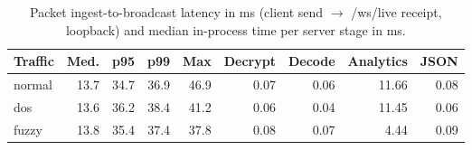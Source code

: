 \begin{table}[t]
\centering
\caption{Packet ingest-to-broadcast latency in ms (client send $\rightarrow$ /ws/live receipt, loopback) and median in-process time per server stage in ms.}
\label{tab:sys_ingest_latency}
\scriptsize
\begin{tabular}{lrrrrrrrr}
\toprule
Traffic & Med. & p95 & p99 & Max & Decrypt & Decode & Analytics & JSON \\
\midrule
normal & 13.7 & 34.7 & 36.9 & 46.9 & 0.07 & 0.06 & 11.66 & 0.08 \\
dos & 13.6 & 36.2 & 38.4 & 41.2 & 0.06 & 0.04 & 11.45 & 0.06 \\
fuzzy & 13.8 & 35.4 & 37.4 & 37.8 & 0.08 & 0.07 & 4.44 & 0.09 \\
\bottomrule
\end{tabular}
\end{table}
